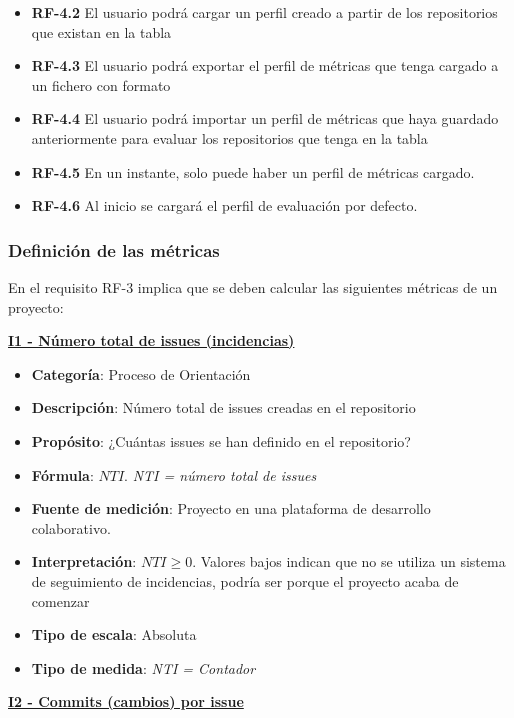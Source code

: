 \begin{itemize}
\begin{itemize}
		\item \textbf{RF-4.2} El usuario podrá cargar un perfil creado a partir de los repositorios que existan en la tabla
		\item \textbf{RF-4.3} El usuario podrá exportar el perfil de métricas que tenga cargado a un fichero con formato 
		\item \textbf{RF-4.4} El usuario podrá importar un perfil de métricas que haya guardado anteriormente para evaluar los repositorios que tenga en la tabla
		\item \textbf{RF-4.5} En un instante, solo puede haber un perfil de métricas cargado.
		\item \textbf{RF-4.6} Al inicio se cargará el perfil de evaluación por defecto.
	\end{itemize}
\end{itemize}

\subsubsection{Definición de las métricas}\label{sect:B_5_1_1}

En el requisito RF-3 implica que se deben calcular las siguientes métricas de un proyecto:

\textbf{\underline{I1 - Número total de issues (incidencias)}}

\begin{itemize}
	\item \textbf{Categoría}: Proceso de Orientación
	\item \textbf{Descripción}: Número total de issues creadas en el repositorio
	\item \textbf{Propósito}: ¿Cuántas issues se han definido en el repositorio?
	\item \textbf{Fórmula}: $NTI$. \textit{NTI = número total de issues}
	\item \textbf{Fuente de medición}: Proyecto en una plataforma de desarrollo colaborativo.
	\item \textbf{Interpretación}: $NTI \geq 0$. Valores bajos indican que no se utiliza un sistema de seguimiento de incidencias, podría ser porque el proyecto acaba de comenzar
	\item \textbf{Tipo de escala}: Absoluta
	\item \textbf{Tipo de medida}: \textit{NTI = Contador}
\end{itemize}

\textbf{\underline{I2 - Commits (cambios) por issue}}

